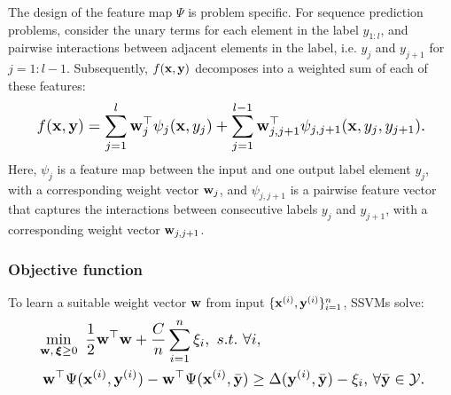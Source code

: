 The design of the feature map $\Psi$ is problem specific.
For sequence prediction problems,
consider the unary
terms for each element in the label $y_{1:l}$, and pairwise interactions between
adjacent elements in the label,
i.e. $y_j$ and $y_{j+1}$ for $j=1 : l \!-\! 1$.
Subsequently, $f(\mathbf{x},\mathbf{y})$ decomposes into a weighted sum of
each of these features: %
\begin{equation}
\label{eq:jointfeature}
\resizebox{0.909\linewidth}{!}{$\displaystyle
f(\x, \y) = %
\sum_{j=1}^l \w_j^\top \psi_j(\x, y_j) + \sum_{j=1}^{l-1} \w_{j,j+1}^\top \psi_{j,j+1}(\x, y_{j}, y_{j+1}).
$}
\end{equation}
Here, $\psi_j$ is a feature map between the input and one output label element $y_j$, with a corresponding weight vector $\mathbf{w}_j$,
and $\psi_{j,j+1}$ is a pairwise feature vector that captures the interactions between consecutive labels $y_j$ and $y_{j+1}$,
with a corresponding weight vector $\mathbf{w}_{j,j+1}$.

\subsubsection{Objective function}
To learn a suitable weight vector $\mathbf{w}$ from input $\{\mathbf{x}^{({i})}, \mathbf{y}^{({i})}\}_{i=1}^n$,
SSVMs solve: %
\begin{equation}
\label{eq:nslack}
\resizebox{0.909\linewidth}{!}{$\displaystyle
\begin{aligned}
& \min_{\w, \, \bm{\xi} \ge 0} \ \frac{1}{2} \w^\top \w + \frac{C}{n} \sum_{i=1}^n \xi_i, 
\ s.t. \ \forall i, \\
& \ \w^\top \Psi(\x^{(i)}, \y^{(i)}) - \w^\top \Psi(\x^{(i)}, \bar{\y}) \ge
  \Delta(\y^{(i)}, \bar{\y}) - \xi_i, \, \forall \bar\y \in \mathcal{Y}.
\end{aligned}
$} %
\end{equation}

